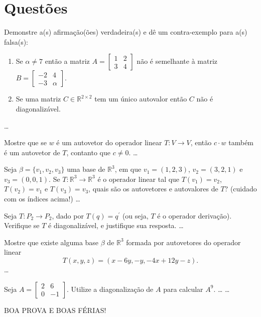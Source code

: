 \documentclass[12pt,a4paper]{article}
\newcommand*\R{\mathbb{R}}
\begin{document}
\section*{Questões}
\begin{ExerciseList}
\Exercise[title={2,0}]
Demonstre a(s) afirmação(ões) verdadeira(s) e dê um contra-exemplo para a(s) falsa(s):
\begin{enumerate}
\item Se $\alpha \neq 7$ então a matriz $A
=
\begin{bmatrix}
1 & 2 \\ 3 & 4
\end{bmatrix}
$ não é semelhante à matriz $B=
\begin{bmatrix}
-2 & 4 \\ -3 & \alpha
\end{bmatrix}$.
\item Se uma matriz $C \in \R^{2 \times 2}$ tem um único autovalor então $C$ não é diagonalizável.
\end{enumerate}
\Answer
\color{red}
\ldots


\Exercise[title={2,0}] Mostre que se $w$ é um autovetor do operador linear $T: V \to V$, então $c \cdot w$ também é um autovetor de $T$, contanto que $c \neq 0$.
\Answer
\color{red}
\ldots


\Exercise[title={2,0}] Seja $\beta = \{ v_1, v_2, v_3 \}$ uma base de $\R^3$, em que $v_1 = (1,2,3)$, $v_2 = (3,2,1)$ e $v_3 = (0,0,1)$. Se $T: \R^3 \to \R^3$ é o operador linear tal que $T(v_1) = v_2$, $T(v_2) = v_1$ e $T(v_3) = v_3$, quais são os autovetores e autovalores de $T$? (cuidado com os índices acima!)
\Answer
\color{red}
\ldots


\Exercise[title={2,0}] Seja $T: P_2 \to P_2$, dado por $T(q) = q^\prime$ (ou seja, $T$ é o operador derivação). Verifique se $T$ é diagonalizável, e justifique sua resposta.
\Answer
\color{red}
\ldots


\Exercise[title={2,0}]
Mostre que existe alguma base $\beta$ de $\R^3$ formada por autovetores do operador linear
\[
T(x,y,z) = (x - 6 y, -y, -4 x + 12 y - z).
\]
\Answer
\color{red}
\ldots


\Exercise[title={2,0}]
Seja $A =
\begin{bmatrix}
2 & 6 \\ 0 & -1
\end{bmatrix}$. Utilize a diagonalização de $A$ para calcular $A^9$.
\Answer \ldots
\color{red}
\ldots
\end{ExerciseList}

\vfill
\begin{center}
BOA PROVA E BOAS FÉRIAS!
\end{center}

\end{document}
